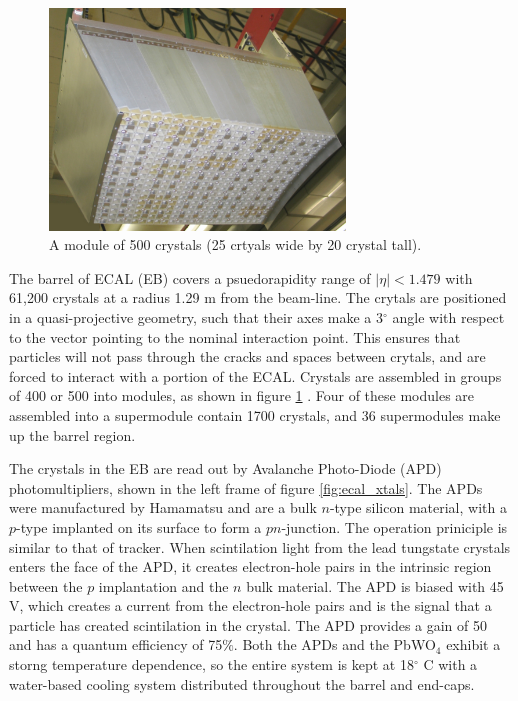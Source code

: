\begin{figure}[h]
   \centering
  \includegraphics[width=0.7\textwidth]{Figures/CMS_Diagrams/ECAL__Xtal_Module.pdf}
  \caption{A module of 500 crystals (25 crtyals wide by 20 crystal tall). } \label{fig:ecal_xtal_module}
\end{figure}

\par The barrel of ECAL (EB) covers a psuedorapidity range of
$|\eta|<1.479$ with 61,200 crystals at a radius 1.29 m from the
beam-line.  The crytals are positioned in a quasi-projective geometry,
such that their axes make a 3$^{\circ}$ angle with respect to the
vector pointing to the nominal interaction point.  This ensures that
particles will not pass through the cracks and spaces between crytals,
and are forced to interact with a portion of the ECAL. Crystals are
assembled in groups of 400 or 500 into modules, as shown in figure
\ref{fig:ecal_xtal_module} .  Four of these modules are assembled into
a supermodule contain 1700 crystals, and 36 supermodules make up the
barrel region. 

\par The crystals in the EB are read out by Avalanche Photo-Diode (APD)
photomultipliers, shown in the left frame of figure
\ref{fig:ecal_xtals}.  The APDs were manufactured by Hamamatsu and are
a bulk $n$-type silicon material, with a $p$-type implanted on its
surface to form a $pn$-junction.  The operation priniciple is similar
to that of tracker.  When scintilation light from the lead tungstate
crystals enters the face of the APD, it creates electron-hole pairs in
the intrinsic region between the $p$ implantation and the $n$ bulk
material.  The APD is biased with 45 V, which creates a current from
the electron-hole pairs and is the signal that a particle has created
scintilation in the crystal.  The APD provides a gain of 50 and has a
quantum efficiency of 75$\%$.  Both the APDs and the PbWO$_{4}$
exhibit a storng temperature dependence, so the entire system is kept
at 18$^{\circ}$ C with a water-based cooling system distributed
throughout the barrel and end-caps.  

